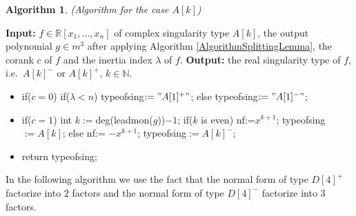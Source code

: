 \documentclass{amsproc}
\begin{document}
\newtheorem{A[k]}[kjet]{Algorithm}
\begin{A[k]}(Algorithm for the case $A[k]$)
\end{A[k]}
\noindent\textnormal{\bf Input:} $f\in \mathbb R[x_1,\ldots,x_n]$ of complex singularity type $A[k]$, the output polynomial $g\in m^3$ after applying Algorithm \ref{AlgorithmSplittingLemma}, the corank $c$ of $f$ and the inertia index $\lambda$ of $f$.\newline
\textnormal{\bf Output:} the real singularity type of $f$, i.e.~$A[k]^-$ or $A[k]^+$, $k\in\mathbb N$.
\begin{itemize}
\item if($c=0$)\newline
\phantom{}\quad if($\lambda<n$)\newline
\phantom{}\quad\quad typeofsing$:="A[1]^+"$;\newline
\phantom{}\quad else\newline
\phantom{}\quad\quad typeofsing$:="A[1]^-"$;
\item if($c=1$)\newline
\phantom{}\quad int $k:= $deg(leadmon($g$))$ -1$;\newline
\phantom{}\quad if($k$ is even)\newline
\phantom{}\quad\quad nf:=$x^{k+1}$;\newline
\phantom{}\quad\quad typeofsing$:= A[k]$;\newline
\phantom{}\quad else\newline
\phantom{}\quad\quad nf:= $-x^{k+1}$;\newline
\phantom{}\quad\quad typeofsing$:= A[k]^-;$
\item return typeofsing;
\end{itemize}

In the following algorithm we use the fact that the normal form of type $D[4]^+$ factorize into $2$ factors and the normal form of type $D[4]^-$ factorize into $3$ factors. 
\end{document}
